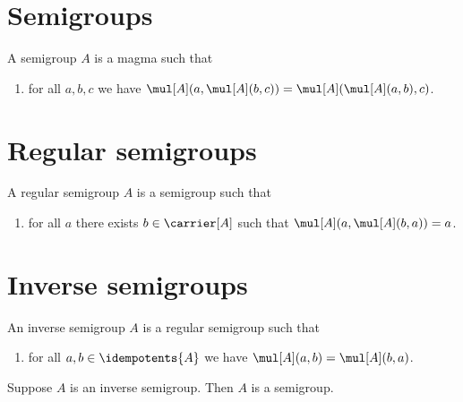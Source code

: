 \section{Semigroups}

\begin{struct}\label{semigroup}
    A semigroup $A$ is a magma such that
    \begin{enumerate}
        \item\label{semigroup_assoc} for all $a, b, c$ we have $\mul[A](a,\mul[A](b,c)) = \mul[A](\mul[A](a,b),c)$.
    \end{enumerate}
\end{struct}



\section{Regular semigroups}


\begin{struct}\label{regularsemigroup}
    A regular semigroup $A$ is a semigroup such that
    \begin{enumerate}
        \item\label{regularsemigroup_regular} for all $a$ there exists $b\in\carrier[A]$ such that $\mul[A](a, \mul[A](b, a)) = a$.
    \end{enumerate}
\end{struct}



\section{Inverse semigroups}

\begin{struct}\label{inversesemigroup}
    An inverse semigroup $A$ is a regular semigroup such that
    \begin{enumerate}
        \item\label{inversesemigroup_comm} for all $a,b\in\idempotents{A}$ we have $\mul[A](a, b) = \mul[A](b, a)$.
    \end{enumerate}
\end{struct}

\begin{proposition}\label{inversesemigroup_is_semigroup}
    Suppose $A$ is an inverse semigroup.
    Then $A$ is a semigroup.
\end{proposition}


